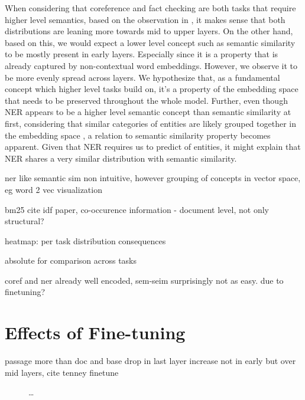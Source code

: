 When considering that coreference and fact checking are both tasks that require higher level semantics, based on the observation in \cite{tenney-etal-2019-bert}, it makes sense that both distributions are leaning more towards mid to upper layers. On the other hand, based on this, we would expect a lower level concept such as semantic similarity to be mostly present in early layers. Especially since it is a property that is already captured by non-contextual word embeddings. However, we observe it to be more evenly spread across layers. We hypothesize that, as a fundamental concept which higher level tasks build on, it's a property of the embedding space that needs to be preserved throughout the whole model.
Further, even though NER appears to be a higher level semantic concept than semantic similarity at first, considering that similar categories of entities are likely grouped together in the embedding space \cite{DBLP:journals/corr/abs-1301-3781, pennington2014glove}, a relation to semantic similarity property becomes apparent. Given that NER requires us to predict  of entities, it might explain that NER shares a very similar distribution with semantic similarity.


ner like semantic sim non intuitive, however grouping of concepts in vector space, eg word 2 vec visualization

bm25 cite idf paper, co-occurence information - document level, not only structural?



heatmap: per task distribution consequences

absolute for comparison across tasks

coref and ner already well encoded, sem-seim surprisingly not as easy. due to finetuning?

\section{Effects of Fine-tuning}
passage more than doc and base
drop in last layer
increase not in early but over mid layers, cite tenney finetune


\begin{figure}%
    \centering
    \caption{\dots}
\end{figure}

